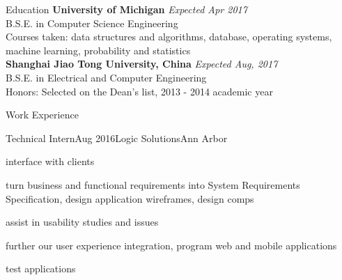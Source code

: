 \documentclass{resume} %
\begin{document}

\begin{rSection}{Education}
{\bf University of Michigan} \hfill {\em Expected Apr 2017} \\ 
B.S.E. in Computer Science Engineering\\
Courses taken: data structures and algorithms, database, operating systems, machine learning, probability and statistics\\
{\bf Shanghai Jiao Tong University, China} \hfill {\em Expected Aug, 2017} \\ 
B.S.E. in Electrical and Computer Engineering \\
Honors: Selected on the Dean's list, 2013 - 2014 academic year

\end{rSection}

\begin{rSection}{Work Experience}
	\begin{rSubsection}{Technical Intern}{Aug 2016}{Logic Solutions}{Ann Arbor}
	\item interface with clients
	\item turn business and functional requirements into System Requirements Specification, design application wireframes, design comps
	\item assist in usability studies and issues
	\item further our user experience integration, program web and mobile applications
	\item test applications
	\end{rSubsection}
\end{rSection}
\end{document}
